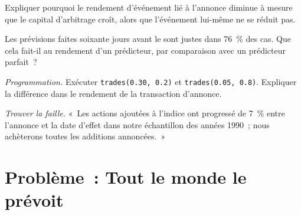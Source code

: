 \begin{exercise}[$\star\star$]\label{exo:s1:index-rebalancing:5}
Expliquer pourquoi le rendement d'événement lié à l'annonce diminue à mesure que le capital d'arbitrage croît, alors que l'événement lui-même ne se réduit pas.
\end{exercise}

\begin{exercise}[$\star\star$]\label{exo:s1:index-rebalancing:6}
Les prévisions faites soixante jours avant le  sont justes dans 76~\% des cas. Que cela fait-il au rendement d'un prédicteur, par comparaison avec un prédicteur parfait~?
\end{exercise}

\begin{exercise}[$\star\star\star$]\label{exo:s1:index-rebalancing:7}
\emph{Programmation.} Exécuter \texttt{trades(0.30, 0.2)} et \texttt{trades(0.05, 0.8)}. Expliquer la différence dans le rendement de la transaction d'annonce.
\end{exercise}

\begin{exercise}[$\star\star\star$]\label{exo:s1:index-rebalancing:8}
\emph{Trouver la faille.} «~Les actions ajoutées à l'indice ont progressé de 7~\% entre l'annonce et la date d'effet dans notre échantillon des années 1990~; nous achèterons toutes les
additions annoncées.~»
\end{exercise}

\section{Problème~: Tout le monde le prévoit}


